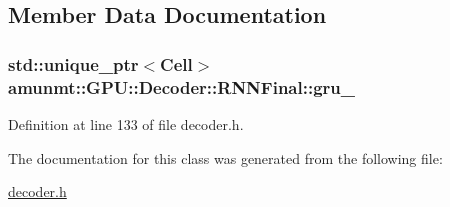 \subsection{Member Data Documentation}
\subsubsection[{\texorpdfstring{gru\+\_\+}{gru_}}]{\setlength{\rightskip}{0pt plus 5cm}std\+::unique\+\_\+ptr$<${\bf Cell}$>$ amunmt\+::\+G\+P\+U\+::\+Decoder\+::\+R\+N\+N\+Final\+::gru\+\_\+\hspace{0.3cm}{\ttfamily [private]}}\hypertarget{classamunmt_1_1GPU_1_1Decoder_1_1RNNFinal_ac68edc629676f353c6c206b6ebc5b15d}{}\label{classamunmt_1_1GPU_1_1Decoder_1_1RNNFinal_ac68edc629676f353c6c206b6ebc5b15d}


Definition at line 133 of file decoder.\+h.



The documentation for this class was generated from the following file\+:\begin{DoxyCompactItemize}
\item 
\hyperlink{decoder_8h}{decoder.\+h}\end{DoxyCompactItemize}
